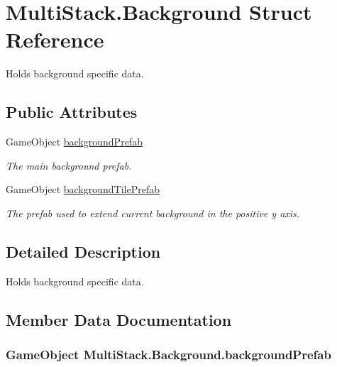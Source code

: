 \hypertarget{struct_multi_stack_1_1_background}{}\section{Multi\+Stack.\+Background Struct Reference}
\label{struct_multi_stack_1_1_background}


Holds background specific data.  


\subsection*{Public Attributes}
\begin{DoxyCompactItemize}
\item 
Game\+Object \hyperlink{struct_multi_stack_1_1_background_a21945b14ac9b5f6aef14e1d69be9a267}{background\+Prefab}
\begin{DoxyCompactList}\small\item\em The main background prefab. \end{DoxyCompactList}\item 
Game\+Object \hyperlink{struct_multi_stack_1_1_background_a2445bc70876fadb6dbb7d0914c276f21}{background\+Tile\+Prefab}
\begin{DoxyCompactList}\small\item\em The prefab used to extend current background in the positive y axis. \end{DoxyCompactList}\end{DoxyCompactItemize}


\subsection{Detailed Description}
Holds background specific data. 



\subsection{Member Data Documentation}
\hypertarget{struct_multi_stack_1_1_background_a21945b14ac9b5f6aef14e1d69be9a267}{}
\subsubsection[{background\+Prefab}]{\setlength{\rightskip}{0pt plus 5cm}Game\+Object Multi\+Stack.\+Background.\+background\+Prefab}\label{struct_multi_stack_1_1_background_a21945b14ac9b5f6aef14e1d69be9a267}


